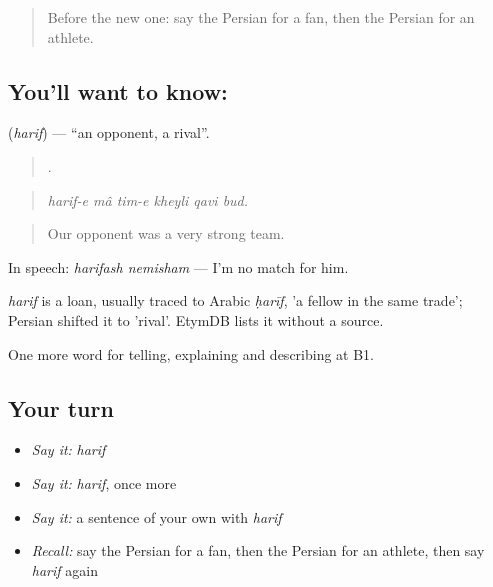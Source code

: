 \label{lesson:FA-C512-harif}



\begin{quote}
Before the new one: say the Persian for a fan, then the Persian for an athlete.
\end{quote}

\subsection*{You'll want to know: }
\textbf{} (\emph{harif}) — \textquotedblleft{}an opponent, a rival\textquotedblright{}.

\begin{quote}
     .
\end{quote}

\begin{quote}
\emph{harif-e mâ tim-e kheyli qavi bud.}
\end{quote}

\begin{quote}
Our opponent was a very strong team.
\end{quote}

In speech: \emph{harifash nemisham} — I'm no match for him.

\begin{cousinweb}
\emph{harif} is a loan, usually traced to Arabic \emph{ḥarīf}, 'a fellow in the same trade'; Persian shifted it to 'rival'. EtymDB lists it without a source.
\end{cousinweb}

\begin{grammarlens}[title={What you've built}]
One more word for telling, explaining and describing at B1.
\end{grammarlens}

\subsection*{Your turn}
\begin{itemize}
\raggedright
  \item \emph{Say it:} \emph{harif}
  \item \emph{Say it:} \emph{harif}, once more
  \item \emph{Say it:} a sentence of your own with \emph{harif}
  \item \emph{Recall:} say the Persian for a fan, then the Persian for an athlete, then say \emph{harif} again
\end{itemize}

